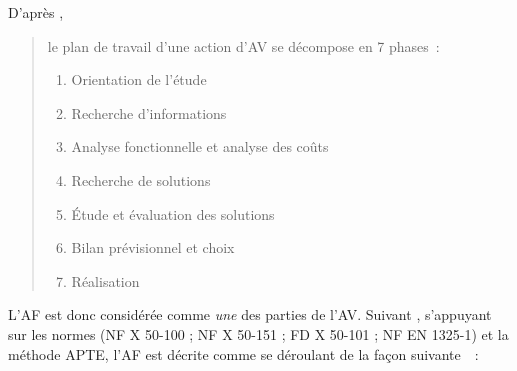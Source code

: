 D'après \citeauthor{yannou_analyse_1998},
\blockcquote{yannou_analyse_1998}{le plan de travail d'une action d'\gls{AV} se décompose en 7 phases~:
\begin{enumerate}
 \item Orientation de l'étude
 \item Recherche d'informations
 \item Analyse fonctionnelle et analyse des coûts
 \item Recherche de solutions
 \item Étude et évaluation des solutions
 \item Bilan prévisionnel et choix
 \item Réalisation
\end{enumerate}
}


L'\gls{AF} est donc considérée comme \emph{une} des parties de l'\gls{AV}.
Suivant \citeauthor{philippe_taillard_demarche_2010},
s'appuyant sur les normes (NF X 50-100 ; NF X 50-151 ; FD X 50-101 ; NF EN 1325-1) et la méthode APTE\textregistered, %
l'\gls{AF} est décrite comme se déroulant de la façon suivante~\cite{philippe_taillard_demarche_2010}~:

